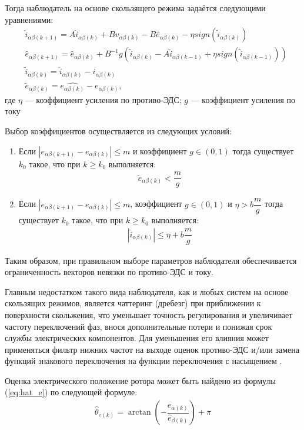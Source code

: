 Тогда наблюдатель на основе скользящего режима задаётся следующими уравнениями:
\begin{align}
	&\hat{i}_{\alpha\beta(k+1)}=A\hat{i}_{\alpha\beta(k)}+Bv_{\alpha\beta(k)}-B\hat{e}_{\alpha\beta(k)}-\eta sign(\tilde{i}_{\alpha\beta(k)})\\
	\label{eq:hat_e}
	&\hat{e}_{\alpha\beta(k+1)}=\hat{e}_{\alpha\beta(k)}+B^{-1}g(\tilde{i}_{\alpha\beta(k)}-A\tilde{i}_{\alpha\beta(k-1)}+\eta sign(\tilde{i}_{\alpha\beta(k-1)}))\\
	&\tilde{i}_{\alpha\beta(k)}=\hat{i}_{\alpha\beta(k)}-i_{\alpha\beta(k)}\\
	&\tilde{e}_{\alpha\beta(k)}=\hat{e_{\alpha\beta(k)}}-e_{\alpha\beta(k)},
\end{align}где $\eta$ --- коэффициент усиления по противо-ЭДС; $g$ --- коэффициент усиления по току

Выбор коэффициентов осуществляется из следующих условий:
\begin{enumerate}
	\item Если $|e_{\alpha\beta(k+1)}-e_{\alpha\beta(k)}|\leq m$ и коэффициент $g\in (0, 1)$ тогда существует $k_0$ такое, что при $k\geq k_0$ выполняется:
	\begin{align*}
		\tilde{e}_{\alpha\beta(k)}<\dfrac{m}{g}
	\end{align*}
	\item Если $|e_{\alpha\beta(k+1)}-e_{\alpha\beta(k)}|\leq m$, коэффициент $g\in (0, 1)$ и $\eta>b\dfrac{m}{g}$ тогда существует $k_0$ такое, что при $k\geq k_0$ выполняется:
	\begin{align*}
		|\tilde{i}_{\alpha\beta(k)}|\leq \eta +b\dfrac{m}{g}
	\end{align*}
\end{enumerate}

Таким образом, при правильном выборе параметров наблюдателя обеспечивается ограниченность векторов невязки по противо-ЭДС и току.

Главным недостатком такого вида наблюдателя, как и любых систем на основе скользящих режимов, является чаттеринг (дребезг) при приближении к поверхности скольжения, что уменьшает точность регулирования и увеличивает частоту переключений фаз, внося дополнительные потери и понижая срок службы электрических компонентов. Для уменьшения его влияния может применяться фильтр нижних частот на выходе оценок противо-ЭДС \cite{art:smo} и/или замена функций знакового переключения на функции переключения с насыщением \cite{art:dtc_smo}.

Оценка электрического положение ротора может быть найдено из формулы (\ref{eq:hat_e}) по следующей формуле:
\begin{align}
\label{eq:theta_e}
	\hat{\theta}_{e(k)} = \arctan\left(-\dfrac{\hat{e}_{\alpha(k)}}{\hat{e}_{\beta(k)}}\right)+\pi
\end{align}

